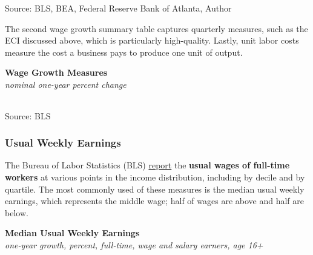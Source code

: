 \documentclass{report}
\newcommand{\tbllink}[1]{\href{https://raw.githubusercontent.com/bdecon/US-chartbook/master/chartbook/data/#1}{\faTable}}
\begin{document}
{\begin{minipage}{0.76\textwidth}
\footnotesize{Source: BLS, BEA, Federal Reserve Bank of Atlanta, Author} \hfill \tbllink{wages_yy_monthly.csv} 
\end{minipage}
\newpage
\vspace*{-10mm}      

\begin{minipage}{0.76\textwidth}
\small The second wage growth summary table captures quarterly measures, such as the ECI discussed above, which is particularly high-quality. Lastly, unit labor costs measure the cost a business pays to produce one unit of output. 
\vspace{0.5mm}

\normalsize \textbf{Wage Growth Measures}\\
\footnotesize{\textit{nominal one-year percent change}}
\vspace*{-8mm}

 \setlength{\tabcolsep}{3.0pt} \color{black!90}
{\renewcommand{\arraystretch}{1.5}
\hspace{-1mm} \begin{tabular}{p{42mm} R{7.2mm} R{7.2mm} R{7.2mm} R{7.2mm} R{7.2mm} 
		R{7.2mm} R{7.2mm} R{7.2mm} }
 \hline
	\end{tabular}}
	\vspace{-2.5mm}
				
\footnotesize{Source: BLS} \hfill  \tbllink{wages_yy_quarterly.csv} 
\vspace{1mm}

\subsubsection*{Usual Weekly Earnings}
\vspace*{-1mm}

\small The Bureau of Labor Statistics (BLS) \href{https://www.bls.gov/webapps/legacy/cpswktab5.htm}{report} the \textbf{usual wages of full-time workers} at various points in the income distribution, including by decile and by quartile. The most commonly used of these measures is the median usual weekly earnings, which represents the middle wage; half of wages are above and half are below.


\vspace{0.5mm}

\normalsize \textbf{Median Usual Weekly Earnings}\\
\footnotesize{\textit{one-year growth, percent, full-time, wage and salary earners, age 16+}}
\vspace{3.6cm}


\end{minipage}}
\end{document}
